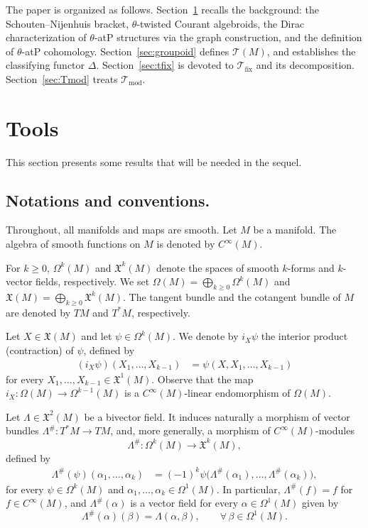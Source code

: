 \documentclass[11pt,a4paper]{article}
\theoremstyle{plain}
\theoremstyle{definition}
\theoremstyle{remark}
\begin{document}
The paper is organized as follows. Section~\ref{sec:tools} recalls the background:
the Schouten--Nijenhuis bracket, $\theta$-twisted Courant algebroids, the Dirac
characterization of $\theta$-atP structures via the graph construction, and
the definition of $\theta$-atP cohomology.
Section~\ref{sec:groupoid} defines  $\mathcal{T}(M)$, and 
establishes the classifying functor $\Delta$.
Section~\ref{sec:tfix} is devoted to  $\mathcal{T}_{\mathrm{fix}}$ and its decomposition.
Section~\ref{sec:Tmod} treats  $\mathcal{T}_{\mathrm{mod}}$.

\section{Tools}
\label{sec:tools}
This section presents some results that will be needed in the sequel.

\subsection{Notations and conventions.}
Throughout, all manifolds and maps are smooth. Let $M$ be a  manifold.
The algebra of smooth functions on $M$ is denoted by $C^{\infty}(M)$.

For $k\geq 0$, $\Omega^{k}(M)$ and $\mathfrak{X}^{k}(M)$ denote the spaces of smooth
$k$-forms and $k$-vector fields, respectively. We set
$\Omega(M)=\bigoplus_{k\geq 0}\Omega^{k}(M)$ and $\mathfrak{X}(M)=\bigoplus_{k\geq 0}\mathfrak{X}^{k}(M)$.
The tangent bundle and the cotangent bundle of $M$ are denoted by $TM$ and $T^{*}M$,
respectively.


Let $X\in \mathfrak{X}(M)$ and let $\psi\in\Omega^{k}(M)$.
We denote by $i_{X}\psi$ the interior product (contraction) of $\psi$, defined by
\begin{align*}
	(i_{X}\psi)(X_{1},\dots,X_{k-1})
	&=\psi(X,X_{1},\dots,X_{k-1})
\end{align*}
for every $X_{1},\dots,X_{k-1}\in\mathfrak{X}^{1}(M)$.
Observe that the map $i_{X}:\Omega(M)\to\Omega^{k-1}(M)$ is a
$C^{\infty}(M)$-linear endomorphism of $\Omega(M)$.

Let $\Lambda\in \mathfrak{X}^{2}(M)$ be a bivector field. It induces naturally a morphism of vector bundles
$\Lambda^\#: T^{*}M\longrightarrow TM$, and, more generally, a morphism of $C^\infty(M)$-modules
\[
\Lambda^\#:\Omega^{k}(M)\longrightarrow \mathfrak{X}^{k}(M),
\]
defined by
\begin{align*}
	\Lambda^\#(\psi)(\alpha_{1},\dots,\alpha_{k})
	&= (-1)^{k}\psi\bigl(\Lambda^\#(\alpha_{1}),\dots,\Lambda^\#(\alpha_{k})\bigr),
\end{align*}
for every $\psi\in \Omega^{k}(M)$ and $\alpha_{1},\dots,\alpha_{k}\in \Omega^{1}(M)$.
In particular, $\Lambda^\#(f)=f$ for $f\in C^\infty(M)$, and $\Lambda^\#(\alpha)$ is a vector field for every
$\alpha\in \Omega^{1}(M)$ given by
\[
\Lambda^\#(\alpha)(\beta)=\Lambda(\alpha,\beta),\qquad \forall\,\beta\in\Omega^{1}(M).
\]
\end{document}

